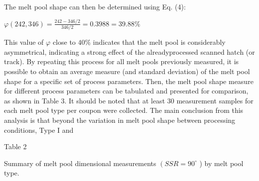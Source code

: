 \documentclass[10pt]{article}
\begin{document}
The melt pool shape can then be determined using Eq. (4):

$\varphi(242,346)=\frac{242-346 / 2}{346 / 2}=0.3988=39.88 \%$

This value of $\varphi$ close to $40 \%$ indicates that the melt pool is considerably asymmetrical, indicating a strong effect of the alreadyprocessed scanned hatch (or track). By repeating this process for all melt pools previously measured, it is possible to obtain an average measure (and standard deviation) of the melt pool shape for a specific set of process parameters. Then, the melt pool shape measure for different process parameters can be tabulated and presented for comparison, as shown in Table 3. It should be noted that at least 30 measurement samples for each melt pool type per coupon were collected. The main conclusion from this analysis is that beyond the variation in melt pool shape between processing conditions, Type I and

Table 2

Summary of melt pool dimensional measurements $\left(S S R=90^{\circ}\right.$ ) by melt pool type.
\end{document}
